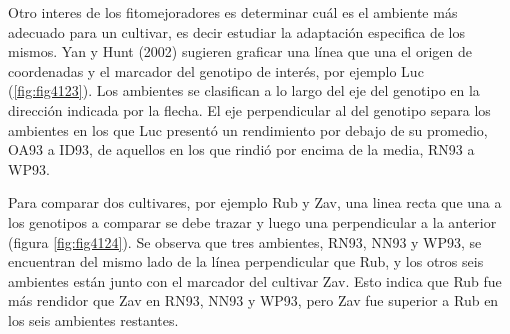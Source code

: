 Otro interes de los fitomejoradores es determinar cuál es el ambiente más adecuado para un cultivar, es decir estudiar la adaptación especifica de los mismos. Yan y Hunt (2002) sugieren graficar una línea que una el origen de coordenadas y el marcador del genotipo de interés, por ejemplo Luc (\ref{fig:fig4123}). Los ambientes se clasifican a lo largo del eje del genotipo en la dirección indicada por la flecha. El eje perpendicular al del genotipo separa los ambientes en los que Luc presentó un rendimiento por debajo de su promedio, OA93 a ID93, de aquellos en los que rindió por encima de la media, RN93 a WP93.


Para comparar dos cultivares, por ejemplo Rub y Zav, una linea recta que una a los genotipos a comparar se debe trazar y luego una perpendicular a la anterior (figura \ref{fig:fig4124}). Se observa que tres ambientes, RN93, NN93 y WP93, se encuentran del mismo lado de la línea perpendicular que Rub, y los otros seis ambientes están junto con el marcador del cultivar Zav. Esto indica que Rub fue más rendidor que Zav en RN93, NN93 y WP93, pero Zav fue superior a Rub en los seis ambientes restantes.


